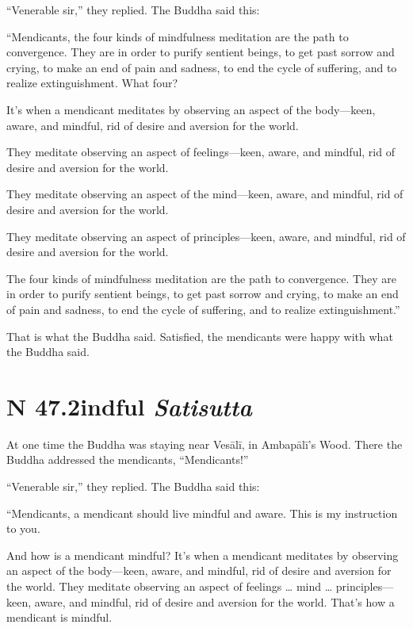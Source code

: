 \documentclass[12pt,openany]{book}%
\newcommand*{\suttatitleacronym}[1]{\smaller[2]{#1}\vspace*{.3em}}
\newcommand*{\suttatitletranslation}[1]{\linebreak{#1}}
\newcommand*{\suttatitleroot}[1]{\linebreak\smaller[2]\itshape{#1}}
\newcommand*{\tocacronym}[1]{\hspace*{-3.3em}{#1}\quad}
\newcommand*{\toctranslation}[1]{#1}
\newcommand*{\tocroot}[1]{(\textit{#1})}
\begin{document}
“Venerable sir,” they replied. The Buddha said this: 

“Mendicants, the four kinds of mindfulness meditation are the path to convergence. They are in order to purify sentient beings, to get past sorrow and crying, to make an end of pain and sadness, to end the cycle of suffering, and to realize extinguishment. What four? 

It’s when a mendicant meditates by observing an aspect of the body—keen, aware, and mindful, rid of desire and aversion for the world. 

They meditate observing an aspect of feelings—keen, aware, and mindful, rid of desire and aversion for the world. 

They meditate observing an aspect of the mind—keen, aware, and mindful, rid of desire and aversion for the world. 

They meditate observing an aspect of principles—keen, aware, and mindful, rid of desire and aversion for the world. 

The four kinds of mindfulness meditation are the path to convergence. They are in order to purify sentient beings, to get past sorrow and crying, to make an end of pain and sadness, to end the cycle of suffering, and to realize extinguishment.” 

That is what the Buddha said. Satisfied, the mendicants were happy with what the Buddha said. 

%
\section*{{\suttatitleacronym SN 47.2}{\suttatitletranslation Mindful }{\suttatitleroot Satisutta}}
\addcontentsline{toc}{section}{\tocacronym{SN 47.2} \toctranslation{Mindful } \tocroot{Satisutta}}

At one time the Buddha was staying near \textsanskrit{Vesālī}, in \textsanskrit{Ambapālī}’s Wood. There the Buddha addressed the mendicants, “Mendicants!” 

“Venerable sir,” they replied. The Buddha said this: 

“Mendicants, a mendicant should live mindful and aware. This is my instruction to you. 

And how is a mendicant mindful? It’s when a mendicant meditates by observing an aspect of the body—keen, aware, and mindful, rid of desire and aversion for the world. They meditate observing an aspect of feelings … mind … principles—keen, aware, and mindful, rid of desire and aversion for the world. That’s how a mendicant is mindful. 
\end{document}
